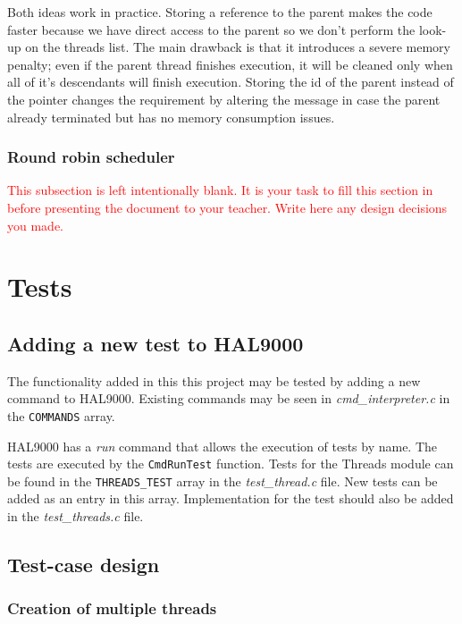  Both ideas work in practice. Storing a reference to the parent makes the code faster because we have direct access to the parent so we don't perform the look-up on the threads list. The main drawback is that it introduces a severe memory penalty; even if the parent thread finishes execution, it will be cleaned only when all of it's descendants will finish execution. Storing the id of the parent instead of the pointer changes the requirement by altering the message in case the parent already terminated but has no memory consumption issues.
 
 \subsubsection{Round robin scheduler}
  \textcolor{red}{This subsection is left intentionally blank. It is your task to fill this section in before presenting the document to your teacher. Write here any design decisions you made.} 



\section{Tests}

\subsection{Adding a new test to HAL9000}

The functionality added in this this project may be tested by adding a new command to HAL9000. Existing commands may be seen in \textit{cmd\_interpreter.c} in the \lstinline|COMMANDS| array. 

HAL9000 has a \textit{run} command that allows the execution of tests by name. The tests are executed by the \lstinline|CmdRunTest| function. Tests for the Threads module can be found in the \lstinline|THREADS_TEST| array in the \textit{test\_thread.c} file. New tests can be added as an entry in this array. Implementation for the test should also be added in the \textit{test\_threads.c} file.  

\subsection{Test-case design}

\subsubsection{Creation of multiple threads}

